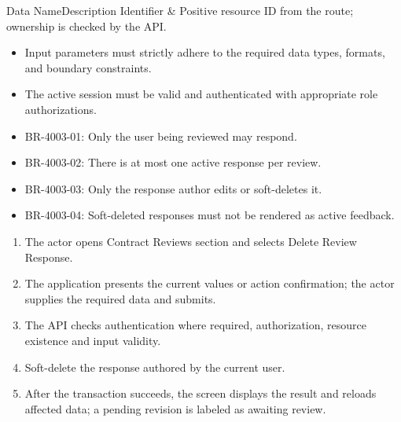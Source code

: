 
\begin{specdatatable}{Data Name}{Description}
Identifier & Positive resource ID from the route; ownership is checked by the API.\\ \hline
\end{specdatatable}

\begin{itemize}[leftmargin=1.6em,topsep=3pt,itemsep=2pt,parsep=0pt,label=$\bullet$]
    \item Input parameters must strictly adhere to the required data types, formats, and boundary constraints.
    \item The active session must be valid and authenticated with appropriate role authorizations.
\end{itemize}

\begin{itemize}[leftmargin=1.6em,topsep=3pt,itemsep=2pt,parsep=0pt,label=$\bullet$]\brrulelist
    \item BR-4003-01: Only the user being reviewed may respond.
    \item BR-4003-02: There is at most one active response per review.
    \item BR-4003-03: Only the response author edits or soft-deletes it.
    \item BR-4003-04: Soft-deleted responses must not be rendered as active feedback.
\end{itemize}

\begin{enumerate}[leftmargin=1.8em,topsep=3pt,itemsep=2pt,parsep=0pt]
    \item The actor opens Contract Reviews section and selects Delete Review Response.
    \item The application presents the current values or action confirmation; the actor supplies the required data and submits.
    \item The API checks authentication where required, authorization, resource existence and input validity.
    \item Soft-delete the response authored by the current user.
    \item After the transaction succeeds, the screen displays the result and reloads affected data; a pending revision is labeled as awaiting review.
\end{enumerate}

